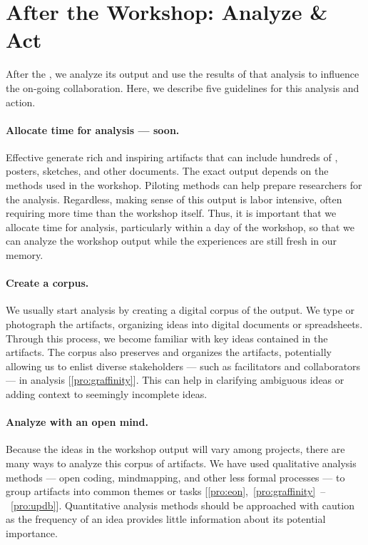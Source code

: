 \section{After the Workshop: Analyze \& Act}
\label{sec:after}

After the \workshop, we analyze its output and use the results of that analysis to influence the on-going collaboration. Here, we describe five guidelines for this analysis and action. 

\paragraph{Allocate time for analysis --- soon.} Effective \workshops generate rich and inspiring artifacts that can include hundreds of \stickyNotes, posters, sketches, and other documents. The exact output depends on the methods used in the workshop. Piloting methods can help prepare researchers for the analysis. Regardless, making sense of this output is labor intensive, often requiring more time than the workshop itself. Thus, it is important that we allocate time for analysis, particularly within a day of the workshop, so that we can analyze the workshop output while the experiences are still fresh in our memory.

\paragraph{Create a corpus.} We usually start analysis by creating a digital corpus of the \workshop output. We type or photograph the artifacts, organizing ideas into digital documents or spreadsheets. Through this process, we become familiar with key ideas contained in the artifacts. The corpus also preserves and organizes the artifacts, potentially allowing us to enlist diverse stakeholders --- such as facilitators and collaborators --- in analysis [\ref{pro:graffinity}]. This can help in clarifying ambiguous ideas or adding context to seemingly incomplete ideas.

\paragraph{Analyze with an open mind.} Because the ideas in the workshop output will vary among projects, there are many ways to analyze this corpus of artifacts. We have used qualitative analysis methods --- open coding, mindmapping, and other less formal processes --- to group artifacts into common themes or tasks [\ref{pro:eon},~\ref{pro:graffinity}~--~\ref{pro:updb}]. Quantitative analysis methods should be approached with caution as the frequency of an idea provides little information about its potential importance.

